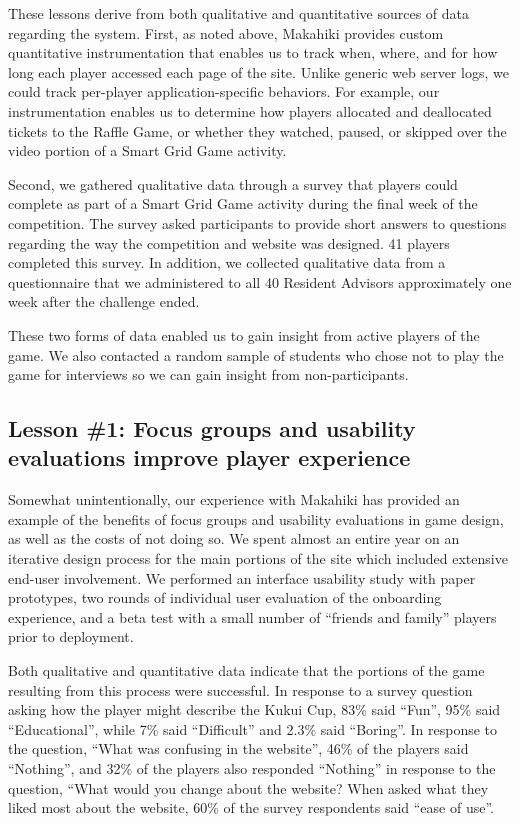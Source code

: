 \documentclass{acm_proc_article-sp}
\begin{document}
These lessons derive from both qualitative and quantitative sources of data
regarding the system.  First, as noted above, Makahiki provides custom
quantitative instrumentation that enables us to track when, where, and for how
long each player accessed each page of the site.  Unlike generic web server
logs, we could track per-player application-specific behaviors. For example,
our instrumentation enables us to determine how players allocated and
deallocated tickets to the Raffle Game, or whether they watched, paused, or
skipped over the video portion of a Smart Grid Game activity.

Second, we gathered qualitative data through a survey that players could complete as part of a Smart Grid Game activity during the final week of the competition. The survey asked participants to provide short answers to questions regarding the way the competition and website was designed.  41 players completed this survey.  In addition, we collected qualitative data from a questionnaire that we administered to all 40 Resident Advisors approximately one week after the challenge ended. 

These two forms of data enabled us to gain insight from active players of
the game. We also contacted a random sample of students who chose not to play the game for interviews so we can gain insight from non-participants.

\subsection{Lesson \#1: Focus groups and usability evaluations improve player
  experience}

Somewhat unintentionally, our experience with Makahiki has provided an
example of the benefits of focus groups and usability evaluations in game
design, as well as the costs of not doing so.  We spent almost an entire
year on an iterative design process for the main portions of the site which
included extensive end-user involvement.  We performed an interface
usability study with paper prototypes, two rounds of individual user
evaluation of the onboarding experience, and a beta test with a small
number of ``friends and family'' players prior to deployment.

Both qualitative and quantitative data indicate that the portions of the
game resulting from this process were successful.  In response to a survey
question asking how the player might describe the Kukui Cup, 83\% said
``Fun'', 95\% said ``Educational'', while 7\% said ``Difficult'' and 2.3\%
said ``Boring''.  In response to the question, ``What was confusing in the
website'', 46\% of the players said ``Nothing'', and 32\% of the players also
responded ``Nothing'' in response to the question, ``What would you change
about the website? When asked what they liked most about the website, 60\%
of the survey respondents said ``ease of use''.
\end{document}
